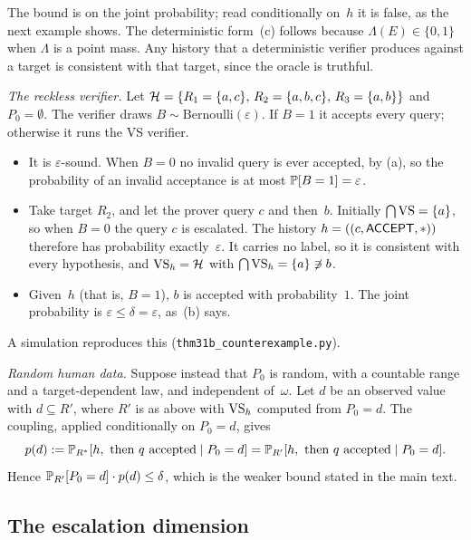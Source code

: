 The bound is on the joint probability; read conditionally on~$h$ it is false, as the next example shows. The deterministic form~(c) follows because $\Lambda(E)\in\{0,1\}$ when $\Lambda$ is a point mass. Any history that a deterministic verifier produces against a target is consistent with that target, since the oracle is truthful.

\emph{The reckless verifier.} Let $\mathcal{H}=\{R_1=\{a,c\},\,R_2=\{a,b,c\},\,R_3=\{a,b\}\}$ and $P_0=\emptyset$. The verifier draws $B\sim\mathrm{Bernoulli}(\varepsilon)$. If $B=1$ it accepts every query; otherwise it runs the VS verifier.
\begin{itemize}
\item It is $\varepsilon$-sound. When $B=0$ no invalid query is ever accepted, by (a), so the probability of an invalid acceptance is at most $\mathbb{P}[B=1]=\varepsilon$.
\item Take target $R_2$, and let the prover query $c$ and then~$b$. Initially $\bigcap\mathrm{VS}=\{a\}$, so when $B=0$ the query $c$ is escalated. The history $h=((c,\textsf{ACCEPT},\ast))$ therefore has probability exactly~$\varepsilon$. It carries no label, so it is consistent with every hypothesis, and $\mathrm{VS}_h=\mathcal{H}$ with $\bigcap\mathrm{VS}_h=\{a\}\not\ni b$.
\item Given~$h$ (that is, $B=1$), $b$ is accepted with probability~$1$. The joint probability is $\varepsilon\le\delta=\varepsilon$, as~(b) says.
\end{itemize}
A simulation reproduces this (\texttt{thm31b\_counterexample.py}).

\emph{Random human data.} Suppose instead that $P_0$ is random, with a countable range and a target-dependent law, and independent of~$\omega$. Let $d$ be an observed value with $d\subseteq R'$, where $R'$ is as above with $\mathrm{VS}_h$ computed from $P_0=d$. The coupling, applied conditionally on $P_0=d$, gives
\[
p(d):=\mathbb{P}_{R^{*}}[h,\ \text{then $q$ accepted}\mid P_0=d]=\mathbb{P}_{R'}[h,\ \text{then $q$ accepted}\mid P_0=d].
\]
Hence $\mathbb{P}_{R'}[P_0=d]\cdot p(d)\le\delta$, which is the weaker bound stated in the main text.

\subsection{The escalation dimension}\label{app:caution:esc}

